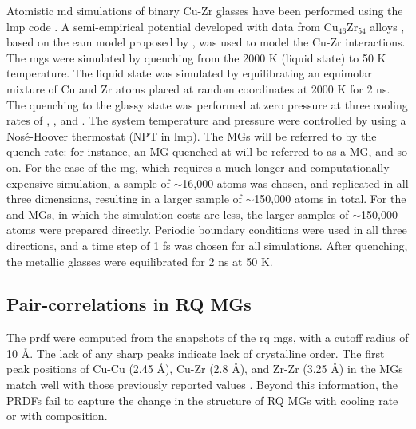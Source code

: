 \begin{changebar}
Atomistic \gls{md} simulations of binary Cu-Zr glasses have been performed using the \gls{lmp} code \cite{Plimpton1995,Thompson2022}.
A semi-empirical potential developed with data from Cu$ _{46}$Zr$ _{54} $ alloys \cite{Mendelev2019}, based on the \gls{eam} model proposed by \textcite{Daw1993}, was used to model the Cu-Zr interactions. The \cz  \gls{mg}s were simulated by quenching from the 2000 K (liquid state) to 50 K temperature. The liquid state was simulated by equilibrating an equimolar mixture of Cu and Zr atoms placed at random coordinates at 2000 K for 2 ns. The quenching to the glassy state was performed at zero pressure at three cooling rates of , ,  and . The system temperature and pressure were controlled by using a Nos\'e-Hoover thermostat (NPT in \gls{lmp}). The MGs will be referred to by the quench rate: for instance, an MG quenched at  will be referred to as a  MG, and so on. For the case of the  \gls{mg}, which requires a much longer and computationally expensive simulation, a sample of $\sim$16,000 atoms was chosen, and replicated in all three dimensions, resulting in a larger sample of $\sim$150,000 atoms in total. For the  and  MGs, in which the simulation costs are less, the larger samples of $\sim$150,000 atoms were prepared directly. Periodic boundary conditions were used in all three directions, and a time step of 1 \gls{fs} was chosen for all simulations. After quenching, the metallic glasses were equilibrated for 2 ns at 50 K. \par
\end{changebar}

\subsection{Pair-correlations in RQ MGs} \label{s:rdf-mgs}
The \gls{prdf} were computed from the snapshots of the \gls{rq} \gls{mg}s, with a cutoff radius of 10 \r{A}. The lack of any sharp peaks indicate lack of crystalline order. The first peak positions of Cu-Cu (2.45 \r{A}), Cu-Zr (2.8 \r{A}), and Zr-Zr (3.25 \r{A}) in the MGs match well with those previously reported values \cite{Duan2005,Nasu2007}. Beyond this information, the PRDFs fail to capture the change in the structure of RQ MGs with cooling rate or with composition. \par

%
